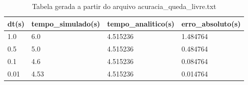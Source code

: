 \begin{table}
\caption{Tabela gerada a partir do arquivo acuracia\_queda\_livre.txt}
\label{tab:acuracia_queda_livre}
\begin{tabular}{llll}
\toprule
dt(s) & tempo\_simulado(s) & tempo\_analitico(s) & erro\_absoluto(s) \\
\midrule
1.0 & 6.0 & 4.515236 & 1.484764 \\
0.5 & 5.0 & 4.515236 & 0.484764 \\
0.1 & 4.6 & 4.515236 & 0.084764 \\
0.01 & 4.53 & 4.515236 & 0.014764 \\
\bottomrule
\end{tabular}
\end{table}
